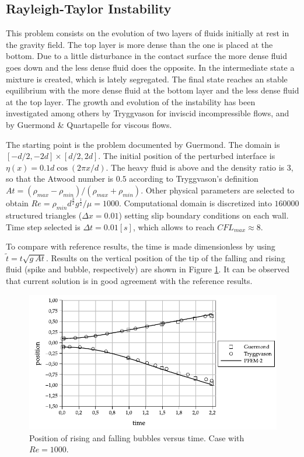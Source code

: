 \subsection{Rayleigh-Taylor Instability}

This problem consists on the evolution of two layers of fluids initially at rest in the gravity field. The top layer is more dense than the one is placed at the bottom. Due to a little disturbance in the contact surface the more dense fluid goes down and the less dense fluid does the opposite. In the intermediate state a mixture is created, which is lately segregated. The final state reaches an stable equilibrium with the more dense fluid at the bottom layer and the less dense fluid at the top layer. The growth and evolution of the instability has been investigated among others by Tryggvason\cite{Tryggvason88} for inviscid incompressible flows, and by Guermond
\& Quartapelle\cite{Guermond00} for viscous flows.

The starting point is the problem documented by Guermond. The domain is $[-d/2,-2d]\times[d/2,2d]$. The initial position of the perturbed interface is $\eta(x) = 0.1d \cos(2\pi x/d)$. The heavy fluid is above and the density ratio is $3$, so that the Atwood
number is $0.5$ according to Tryggvason's definition $At = (\rho_{max}-\rho_{min})/(\rho_{max}+\rho_{min})$. Other physical parameters are selected to obtain $Re=\rho_{min}d^{\frac{3}{2}}g^{\frac{1}{2}}/\mu=1000$. Computational domain is discretized into $160000$ structured triangles ($\Delta x=0.01$) setting slip boundary conditions on each wall. Time step selected is $\Delta t=0.01[s]$, which allows to reach $CFL_{max} \approx 8$.

To compare with reference results, the time is made dimensionless by using $\widetilde{t} = t\sqrt{g\ At}$. Results on the vertical position of the tip of the falling and rising fluid (spike and bubble, respectively) are shown in Figure \ref{fg:rayleigh-rf}. It can be observed that current solution is in good agreement with the reference results.

\begin{figure}[H]
  \begin{center}
      \includegraphics[width=\columnwidth]{images/rayleigh_1.pdf}
  \end{center}
  \caption{\label{fg:rayleigh-rf} Position of rising and falling bubbles versus time. Case with $Re=1000$.}
\end{figure}

